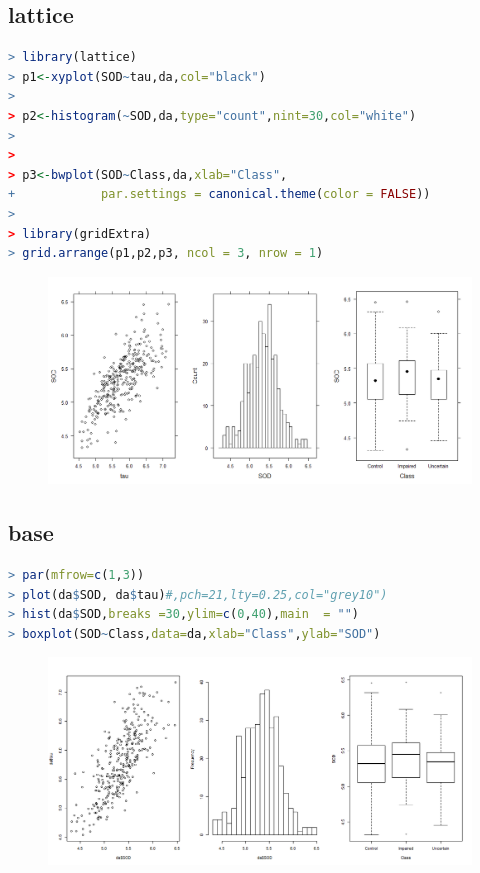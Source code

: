 \documentclass[11pt,a4paper,oneside]{book}
\begin{document}
\subsection{lattice}

\begin{lstlisting}[language=r]
> library(lattice)
> p1<-xyplot(SOD~tau,da,col="black")
> 
> p2<-histogram(~SOD,da,type="count",nint=30,col="white")
> 
> 
> p3<-bwplot(SOD~Class,da,xlab="Class", 
+            par.settings = canonical.theme(color = FALSE))
> 
> library(gridExtra) 
> grid.arrange(p1,p2,p3, ncol = 3, nrow = 1)
\end{lstlisting}
\begin{figure}[H]
	\centering
	\includegraphics[width=\textwidth]{screenshot031}
\end{figure}


\subsection{base}
\begin{lstlisting}[language=r]
> par(mfrow=c(1,3))
> plot(da$SOD, da$tau)#,pch=21,lty=0.25,col="grey10") 
> hist(da$SOD,breaks =30,ylim=c(0,40),main  = "")
> boxplot(SOD~Class,data=da,xlab="Class",ylab="SOD")
\end{lstlisting}
\begin{figure}[H]
	\centering
	\includegraphics[width=\textwidth]{screenshot032}
\end{figure}
\end{document}
